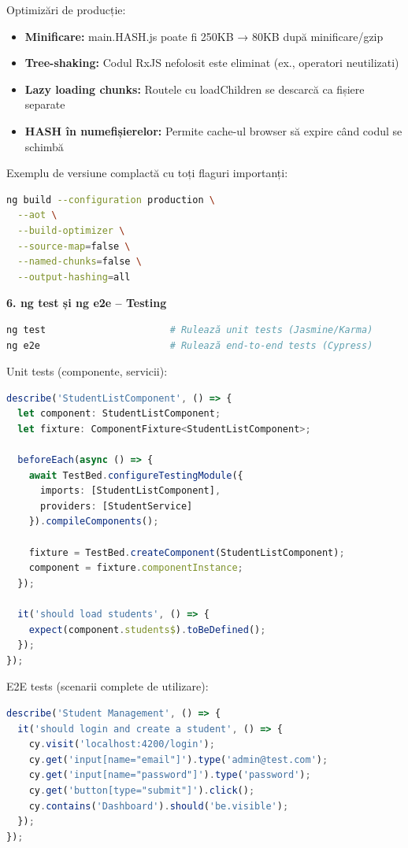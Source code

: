 Optimizări de producție:
\begin{itemize}
  \item \textbf{Minificare:} main.HASH.js poate fi 250KB → 80KB după minificare/gzip
  \item \textbf{Tree-shaking:} Codul RxJS nefolosit este eliminat (ex., operatori neutilizati)
  \item \textbf{Lazy loading chunks:} Routele cu loadChildren se descarcă ca fișiere separate
  \item \textbf{HASH în numefișierelor:} Permite cache-ul browser să expire când codul se schimbă
\end{itemize}

Exemplu de versiune complactă cu toți flaguri importanți:

\begin{lstlisting}[language=bash]
ng build --configuration production \
  --aot \
  --build-optimizer \
  --source-map=false \
  --named-chunks=false \
  --output-hashing=all
\end{lstlisting}

\textbf{6. ng test și ng e2e – Testing}

\begin{lstlisting}[language=bash]
ng test                      # Rulează unit tests (Jasmine/Karma)
ng e2e                       # Rulează end-to-end tests (Cypress)
\end{lstlisting}

Unit tests (componente, servicii):

\begin{lstlisting}[language=TypeScript]
describe('StudentListComponent', () => {
  let component: StudentListComponent;
  let fixture: ComponentFixture<StudentListComponent>;

  beforeEach(async () => {
    await TestBed.configureTestingModule({
      imports: [StudentListComponent],
      providers: [StudentService]
    }).compileComponents();

    fixture = TestBed.createComponent(StudentListComponent);
    component = fixture.componentInstance;
  });

  it('should load students', () => {
    expect(component.students$).toBeDefined();
  });
});
\end{lstlisting}

E2E tests (scenarii complete de utilizare):

\begin{lstlisting}[language=TypeScript]
describe('Student Management', () => {
  it('should login and create a student', () => {
    cy.visit('localhost:4200/login');
    cy.get('input[name="email"]').type('admin@test.com');
    cy.get('input[name="password"]').type('password');
    cy.get('button[type="submit"]').click();
    cy.contains('Dashboard').should('be.visible');
  });
});
\end{lstlisting}

